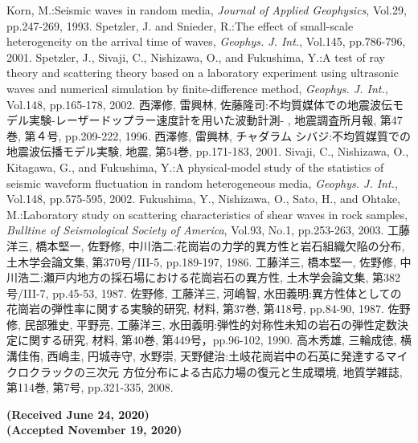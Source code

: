 \documentclass{jsce}
\begin{document}
\begin{thebibliography}{99}
\begin{spacing}{1.175}
	Korn, M.:Seismic waves in random media, 
	{\it Journal of Applied Geophysics}, Vol.29, pp.247-269, 1993.
	Spetzler, J. and Snieder, R.:The effect of small-scale heterogeneity on the arrival time of waves, 
	{\it Geophys. J. Int.}, Vol.145, pp.786-796, 2001. 
	Spetzler, J., Sivaji, C., Nishizawa, O., and Fukushima, Y.:A test of ray theory and scattering theory based on
	a laboratory experiment using ultrasonic waves and numerical 
\lastpagecontrol[0.0cm]{9.0cm}
\newpage
	simulation by finite-difference method, 
	{\it Geophys. J. Int.}, Vol.148, pp.165-178, 2002. 
	西澤修, 雷興林, 佐藤隆司:不均質媒体での地震波伝モデル実験-レーザードップラー速度計を用いた波動計測-
	, 地震調査所月報, 第47巻, 第４号, pp.209-222, 1996.
	西澤修, 雷興林, チャダラム シバジ:不均質媒質での地震波伝播モデル実験, 
	地震, 第54巻, pp.171-183, 2001.
	Sivaji, C., Nishizawa, O., Kitagawa, G., and Fukushima, Y.:A physical-model study of the statistics of seismic waveform fluctuation in random heterogeneous media, 
	{\it Geophys. J. Int.}, Vol.148, pp.575-595, 2002. 
	Fukushima, Y., Nishizawa, O., Sato, H., and Ohtake, M.:Laboratory study on scattering characteristics of shear waves 
	in rock samples, {\it Bulltine of Seismological Society of America}, Vol.93, No.1, pp.253-263, 2003.
	工藤洋三, 橋本堅一, 佐野修, 中川浩二:花崗岩の力学的異方性と岩石組織欠陥の分布,
	土木学会論文集, 第370号/III-5, pp.189-197, 1986.
	工藤洋三, 橋本堅一, 佐野修, 中川浩二:瀬戸内地方の採石場における花崗岩石の異方性, 
	土木学会論文集, 第382号/III-7, pp.45-53, 1987.
	佐野修, 工藤洋三, 河嶋智, 水田義明:異方性体としての花崗岩の弾性率に関する実験的研究, 
	材料, 第37巻, 第418号, pp.84-90, 1987.
	佐野修, 民部雅史, 平野亮, 工藤洋三, 水田義明:弾性的対称性未知の岩石の弾性定数決定に関する研究, 
	材料, 第40巻, 第449号，pp.96-102, 1990.
	高木秀雄, 三輪成徳, 横溝佳侑, 西嶋圭, 円城寺守, 水野崇, 天野健治:土岐花崗岩中の石英に発達するマイクロクラックの三次元
	方位分布による古応力場の復元と生成環境, 地質学雑誌, 第114巻, 第7号, pp.321-335, 2008.
\end{spacing}
\end{thebibliography}
\begin{flushright}
	\small
	\bf{ (Received June 24, 2020)\\
	(Accepted November 19, 2020)}
\end{flushright}
\end{document}
